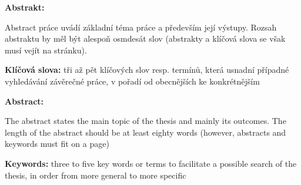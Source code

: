 \textsc{\nazevcz}

\textbf{Abstrakt:}

Abstract práce uvádí základní téma práce a především její výstupy. Rozsah abstraktu by měl být alespoň osmdesát slov (abstrakty a klíčová slova se však musí vejít na stránku).

\textbf{Klíčová slova:} tři až pět klíčových slov resp. termínů, která usnadní případné vyhledávání závěrečné práce, v pořadí od obecnějších ke konkrétnějším

\bigskip


\textsc{\nazeven}

\textbf{Abstract:}

The abstract states the main topic of the thesis and mainly its outcomes. The length of the abstract should be at least eighty words (however, abstracts and keywords must fit on a page)

\textbf{Keywords:} three to five key words or terms to facilitate a possible search of the thesis, in order from more general to more specific